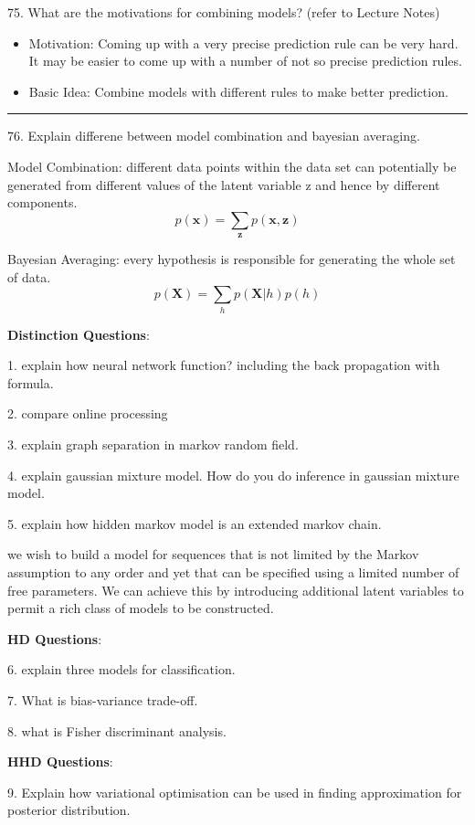 \documentclass[11pt,a4paper]{article}
\newcommand{\bs}[1]{\boldsymbol{#1}}
\newcommand{\BOLD}[1]{\textbf{#1}}
\begin{document}
75. What are the motivations for combining models? (refer to Lecture Notes)
    \begin{itemize}
    \item Motivation: Coming up with a very precise prediction rule can be very hard. It may be easier to come up with a number of not so precise prediction rules.
    \item Basic Idea: Combine models with different rules to make better prediction.
        \end{itemize}
\textcolor{blue}{\rule{\textwidth}{1mm}}

76. Explain differene between model combination and bayesian averaging.

Model Combination: different data points within the data set can potentially be generated from different values of the latent variable z and hence by different components.
$$ p(\bs{x}) = \sum_{\bs{z}} p(\bs{x},\bs{z}) $$

Bayesian Averaging: every hypothesis is responsible for generating the whole set of data.
$$ p(\bs{X}) = \sum_{h} p(\bs{X} | h) p(h) $$

\newpage
\BOLD{Distinction Questions}: 

1. explain how neural network function? including the back propagation with formula.

2. compare online processing  

3. explain graph separation in markov random field.

4. explain gaussian mixture model. How do you do inference in gaussian mixture model.

5. explain how hidden markov model is an extended markov chain.

we wish to build a model for sequences that is not limited by the Markov assumption to any order and yet that can be specified using a limited number of free parameters.
We can achieve this by introducing additional latent variables to permit a rich class of models to be constructed.

\BOLD{HD Questions}:

6. explain three models for classification.

7. What is bias-variance trade-off.

8. what is Fisher discriminant analysis.

\BOLD{HHD Questions}:

9. Explain how variational optimisation can be used in finding approximation for posterior distribution.
\end{document}
